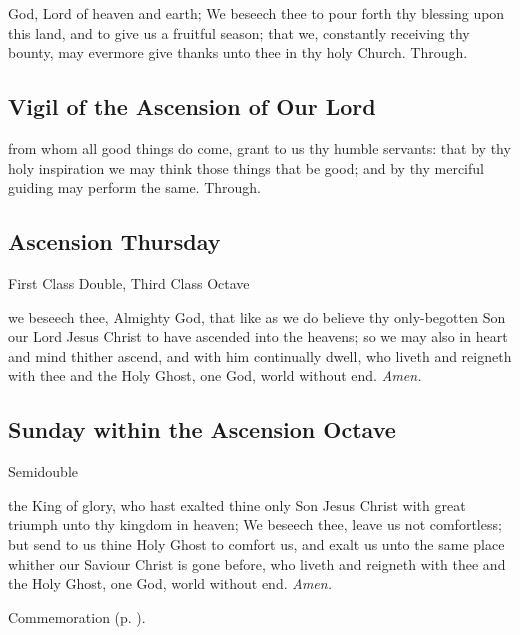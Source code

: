 \collect
{} God, Lord of heaven and earth; We beseech thee to pour forth thy blessing upon this land, and to give us a fruitful season; that we, constantly receiving thy bounty, may evermore give thanks unto thee in thy holy Church. Through.


\subsection{Vigil of the Ascension of Our Lord}

\collect
{} from whom all good things do come, grant to us thy humble servants: that by thy holy inspiration we may think those things that be good; and by thy merciful guiding may perform the same. Through.


\subsection{Ascension Thursday}\label{AscensionThursday}
\begin{inhead}
    {First Class Double, Third Class Octave}
\end{inhead}

\collect\label{AscensionThursdayCollect}
 we beseech thee, Almighty God, that like as we do believe thy only-begotten Son our Lord Jesus Christ to have ascended into the heavens; so we may also in heart and mind thither ascend, and with him continually dwell, who liveth and reigneth with thee and the Holy Ghost, one God, world without end. \textit{Amen.}


\subsection{Sunday within the Ascension Octave}
\begin{inhead}
    {Semidouble}
\end{inhead}

\collect
{} the King of glory, who hast exalted thine only Son Jesus Christ with great triumph unto thy kingdom in heaven; We beseech thee, leave us not comfortless; but send to us thine Holy Ghost to comfort us, and exalt us unto the same place whither our Saviour Christ is gone before, who liveth and reigneth with thee and the Holy Ghost, one God, world without end. \textit{Amen.}

\begin{rubric}
	Commemoration  (p. \pageref{AscensionThursdayCollect}).
\end{rubric}


